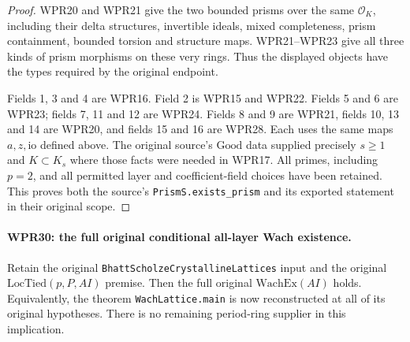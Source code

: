 \documentclass[11pt,a4paper]{article}
\numberwithin{equation}{section}
\theoremstyle{remark}\newtheorem{remark}[theorem]{Remark}
\begin{document}
\begin{proof}
WPR20 and WPR21 give the two bounded prisms over the same
$\mathcal O_K$, including their delta structures, invertible
ideals, mixed completeness, prism containment, bounded torsion
and structure maps. WPR21--WPR23 give all three kinds of
prism morphisms on these very rings. Thus the displayed
objects have the types required by the original endpoint.

Fields 1, 3 and 4 are WPR16. Field 2 is WPR15 and WPR22.
Fields 5 and 6 are WPR23; fields 7, 11 and 12 are WPR24.
Fields 8 and 9 are WPR21, fields 10, 13 and 14 are WPR20,
and fields 15 and 16 are WPR28. Each uses the same maps
$a,z,\mathrm{io}$ defined above. The original source's
$\mathrm{Good}$ data supplied precisely $s\geq1$ and
$K\subset K_s$ where those facts were needed in WPR17.
All primes, including $p=2$, and all permitted layer and
coefficient-field choices have been retained. This proves
both the source's \texttt{Prism\allowbreak S.\allowbreak exists\_\allowbreak prism} and its
exported statement in their original scope.
\end{proof}

\paragraph{WPR30: the full original conditional all-layer Wach existence.}
\label{claim:WPR30}
Retain the original
\texttt{Bhatt\allowbreak Scholze\allowbreak Crystalline\allowbreak Lattices}
input and the original $\mathrm{LocTied}(p,P,AI)$ premise.
Then the full original $\mathrm{WachEx}(AI)$ holds. Equivalently,
the theorem \texttt{Wach\allowbreak Lattice.\allowbreak main} is now reconstructed
at all of its original hypotheses. There is no remaining
period-ring supplier in this implication.
\end{document}
